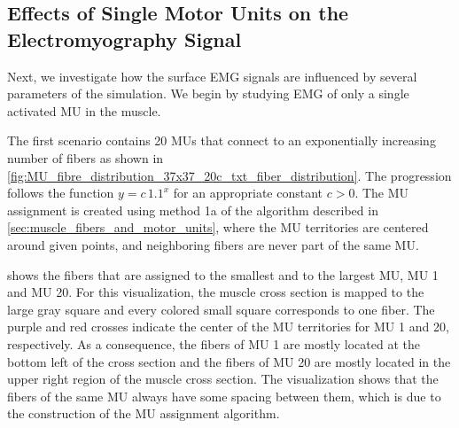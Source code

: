 \subsection{Effects of Single Motor Units on the Electromyography Signal}\label{sec:simfiber_mu}

Next, we investigate how the surface EMG signals are influenced by several parameters of the simulation. We begin by studying EMG of only a single activated MU in the muscle.

The first scenario contains 20 MUs that connect to an exponentially increasing number of fibers as shown in \cref{fig:MU_fibre_distribution_37x37_20c_txt_fiber_distribution}. The progression follows the function $y=c\,1.1^x$ for an appropriate constant $c>0$.
The MU assignment is created using method 1a of the algorithm described in \cref{sec:muscle_fibers_and_motor_units}, where the MU territories are centered around given points, and neighboring fibers are never part of the same MU. 

 shows the fibers that are assigned to the smallest and to the largest MU, MU 1 and MU 20. For this visualization, the muscle cross section is mapped to the large gray square and every colored small square corresponds to one fiber. The purple and red crosses indicate the center of the MU territories for MU 1 and 20, respectively. As a consequence, the fibers of MU 1 are mostly located at the bottom left of the cross section and the fibers of MU 20 are mostly located in the upper right region of the muscle cross section.
The visualization shows that the fibers of the same MU always have some spacing between them, which is due to the construction of the MU assignment algorithm.

